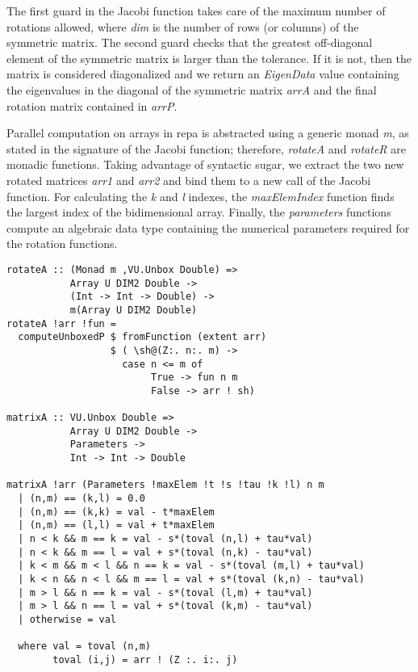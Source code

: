 \documentclass{tmr}
\begin{document}
The first guard in the Jacobi function takes care of the maximum number
of rotations allowed, where \textit{dim} is the number of rows (or
columns) of the symmetric matrix.
%
The second guard checks that the greatest off-diagonal element of the
symmetric matrix is larger than the tolerance.
%
If it is not, then the matrix is considered diagonalized and we return
an \textit{EigenData} value containing the eigenvalues in the diagonal of
the symmetric matrix \textit{arrA} and the final rotation matrix
contained in \textit{arrP}.

Parallel computation on arrays in repa is abstracted using a
generic monad \textit{m}, as stated in the signature of the Jacobi
function; therefore, \textit{rotateA} and \textit{rotateR} are monadic
functions.
%
Taking advantage of syntactic sugar, we extract the two new rotated
matrices \textit{arr1} and \textit{arr2} and bind them to a new call of
the Jacobi function.
%
For calculating the \textit{k} and \textit{l} indexes, the
\textit{maxElemIndex} function finds the largest index of the
bidimensional array.
%
Finally, the \textit{parameters} functions compute an algebraic data
type containing the numerical parameters required for the rotation
functions.

\begin{lstlisting}[float,captionpos=b,belowcaptionskip=4pt, caption= rotateA function]
rotateA :: (Monad m ,VU.Unbox Double) =>
           Array U DIM2 Double ->
           (Int -> Int -> Double) ->
           m(Array U DIM2 Double)           
rotateA !arr !fun =
  computeUnboxedP $ fromFunction (extent arr)
                  $ ( \sh@(Z:. n:. m) ->
                    case n <= m of
                         True -> fun n m
                         False -> arr ! sh)

matrixA :: VU.Unbox Double =>
           Array U DIM2 Double ->
           Parameters ->           
           Int -> Int -> Double
           
matrixA !arr (Parameters !maxElem !t !s !tau !k !l) n m
  | (n,m) == (k,l) = 0.0
  | (n,m) == (k,k) = val - t*maxElem
  | (n,m) == (l,l) = val + t*maxElem
  | n < k && m == k = val - s*(toval (n,l) + tau*val)
  | n < k && m == l = val + s*(toval (n,k) - tau*val)
  | k < m && m < l && n == k = val - s*(toval (m,l) + tau*val)
  | k < n && n < l && m == l = val + s*(toval (k,n) - tau*val)
  | m > l && n == k = val - s*(toval (l,m) + tau*val)
  | m > l && n == l = val + s*(toval (k,m) - tau*val)
  | otherwise = val

  where val = toval (n,m)
        toval (i,j) = arr ! (Z :. i:. j)
                   
\end{lstlisting}
\end{document}
